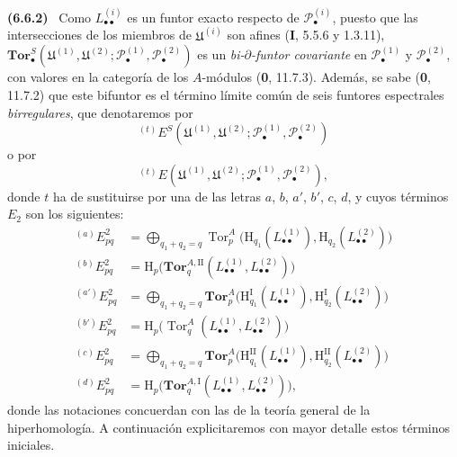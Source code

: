 \documentclass[10pt,oneside]{book}
\newcommand{\oldpage}[2][]{\setcounter{footnote}{0}\marginpar{\scriptsize\textbf{#1}~|~#2}\ignorespaces}
\newenvironment{env}[1][]{\par\medskip\noindent\textbf{(#1)}\ }{\par}
\begin{document}
\begin{env}[6.6.2]
Como $L_{\bullet\bullet}^{(i)}$ es un funtor exacto respecto de
$\mathscr P_\bullet^{(i)}$, puesto que las intersecciones de los miembros
\oldpage[III]{154}
de $\mathfrak U^{(i)}$ son afines (\textbf I, 5.5.6 y 1.3.11),
$\mathbf{Tor}_\bullet^S
(\mathfrak U^{(1)},\mathfrak U^{(2)};
 \mathscr P_\bullet^{(1)},\mathscr P_\bullet^{(2)})$ es un
\emph{bi-$\partial$-funtor covariante} en $\mathscr P_\bullet^{(1)}$ y
$\mathscr P_\bullet^{(2)}$, con valores en la categoría de los $A$-módulos
(\textbf{0}, 11.7.3). Además, se sabe (\textbf{0}, 11.7.2) que este
bifuntor es el término límite común de seis funtores espectrales \emph{birregulares},
que denotaremos por
\[
  {}^{(t)}E^S
  (\mathfrak U^{(1)},\mathfrak U^{(2)};
   \mathscr P_\bullet^{(1)},\mathscr P_\bullet^{(2)})
\]
o por
\[
  {}^{(t)}E
  (\mathfrak U^{(1)},\mathfrak U^{(2)};
   \mathscr P_\bullet^{(1)},\mathscr P_\bullet^{(2)}),
\]
donde $t$ ha de sustituirse por una de las letras $a$, $b$, $a'$, $b'$, $c$,
$d$, y cuyos términos $E_2$ son los siguientes:
\[
\begin{aligned}
  {}^{(a)}E_{pq}^2
  &=\bigoplus_{q_1+q_2=q}
    \operatorname{Tor}_p^A
    \bigl(\mathrm H_{q_1}(L_{\bullet\bullet}^{(1)}),
          \mathrm H_{q_2}(L_{\bullet\bullet}^{(2)})\bigr)\\
  {}^{(b)}E_{pq}^2
  &=\mathrm H_p\bigl(
    \mathbf{Tor}_q^{A,\mathrm{II}}
    (L_{\bullet\bullet}^{(1)},L_{\bullet\bullet}^{(2)})\bigr)\\
  {}^{(a')}E_{pq}^2
  &=\bigoplus_{q_1+q_2=q}
    \mathbf{Tor}_p^A
    \bigl(\mathrm H_{q_1}^{\mathrm I}(L_{\bullet\bullet}^{(1)}),
          \mathrm H_{q_2}^{\mathrm I}(L_{\bullet\bullet}^{(2)})\bigr)\\
  {}^{(b')}E_{pq}^2
  &=\mathrm H_p\bigl(
    \operatorname{Tor}_q^A
    (L_{\bullet\bullet}^{(1)},L_{\bullet\bullet}^{(2)})\bigr)\\
  {}^{(c)}E_{pq}^2
  &=\bigoplus_{q_1+q_2=q}
    \mathbf{Tor}_p^A
    \bigl(\mathrm H_{q_1}^{\mathrm{II}}(L_{\bullet\bullet}^{(1)}),
          \mathrm H_{q_2}^{\mathrm{II}}(L_{\bullet\bullet}^{(2)})\bigr)\\
  {}^{(d)}E_{pq}^2
  &=\mathrm H_p\bigl(
    \mathbf{Tor}_q^{A,\mathrm I}
    (L_{\bullet\bullet}^{(1)},L_{\bullet\bullet}^{(2)})\bigr),
\end{aligned}
\]
donde las notaciones concuerdan con las de la teoría general de la
hiperhomología. A continuación explicitaremos con mayor detalle estos términos
iniciales.
\end{env}
\end{document}
